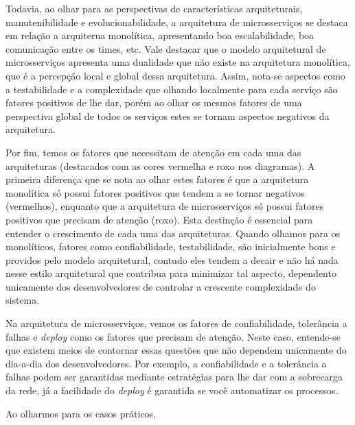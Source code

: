 Todavia, ao olhar para as perspectivas de características arquiteturais, manutenibilidade e
evolucionabilidade, a arquitetura de microsserviços se destaca em relação a arquiterua monolítica,
apresentando boa escalabilidade, boa comunicação entre os times, etc. Vale destacar que o modelo
arquitetural de microsserviços apresenta uma dualidade que não existe na arquitetura monolítica,
que é a percepção local e global dessa arquitetura. Assim, nota-se aspectos como a testabilidade e a
complexidade que olhando localmente para cada serviço são fatores positivos de lhe dar, porém ao
olhar os mesmos fatores de uma perspectiva global de todos os serviços estes se tornam aspectos
negativos da arquitetura.

Por fim, temos os fatores que necessitam de atenção em cada uma das arquiteturas (destacados com as
cores vermelha e roxo nos diagramas). A primeira diferença que se nota ao olhar estes fatores é que
a arquitetura monolítica só possui fatores positivos que tendem a se tornar negativos (vermelhos),
enquanto que a arquitetura de microsserviços só possui fatores positivos que precisam de atenção
(roxo). Esta destinção é essencial para entender o crescimento de cada uma das arquiteturas. Quando
olhamos para os monolíticos, fatores como confiabilidade, testabilidade, são inicialmente bons e
providos pelo modelo arquitetural, contudo eles tendem a decair e não há nada nesse estilo arquitetural
que contribua para minimizar tal aspecto, dependento unicamente dos desenvolvedores de controlar a
crescente complexidade do sistema.

Na arquitetura de microsserviços, vemos os fatores de confiabilidade, tolerância a falhas e \textit{deploy}
como os fatores que precisam de atenção. Neste caso, entende-se que existem meios de contornar essas
questões que não dependem unicamente do dia-a-dia dos desenvolvedores. Por exemplo, a confiabilidade
e a tolerância a falhas podem ser garantidas mediante estratégias para lhe dar com a sobrecarga da
rede, já a facilidade do \textit{deploy} é garantida se você automatizar os processos.

Ao olharmos para os casos práticos, 
